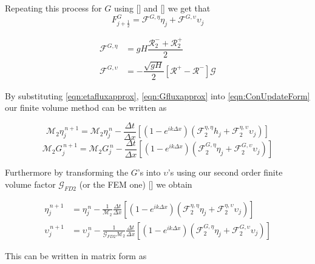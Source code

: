 Repeating this process for $G$ using [] and [] we get that
\begin{equation}
\label{eqn:Gfluxapprox}
F^{G}_{j+\frac{1}{2}} =  \mathcal{F}^{G,\eta} \eta_{j}  + \mathcal{F}^{G,\upsilon} \upsilon_j
\end{equation}

\begin{align*}
\mathcal{F}^{G,\eta} & = gH \dfrac{\mathcal{R}^-_2 + \mathcal{R}^+_2 }{ 2} \\
\mathcal{F}^{G,\upsilon} & = - \dfrac{ \sqrt{gH}}{ 2} \left [  \mathcal{R}^+ -  \mathcal{R}^- \right ] \mathcal{G}
\end{align*}


By substituting \eqref{eqn:etafluxapprox}, \eqref{eqn:Gfluxapprox} into \eqref{eqn:ConUpdateForm} our finite volume method can be written as

\begin{equation*}
\mathcal{M}_2 \eta^{\,n + 1}_{j} = \mathcal{M}_2 \eta^{\,n }_{j} - \frac{\Delta t}{\Delta x}  \left[ \left(1 - e^{ik\Delta x}\right) \left(\mathcal{F}_2^{\eta,\eta} h_{j}  + \mathcal{F}_2^{\eta,\upsilon} \upsilon_j \right) \right]
\end{equation*}
\begin{equation*}
\mathcal{M}_2 G^{\,n + 1}_{j} = \mathcal{M}_2 G^{\,n }_{j} - \frac{\Delta t}{\Delta x}  \left[ \left(1 - e^{ik\Delta x}\right) \left(  \mathcal{F}_2^{G,\eta} \eta_{j}  + \mathcal{F}_2^{G,\upsilon} \upsilon_j \right) \right]
\end{equation*}
	
Furthermore by transforming the $G$'s into $\upsilon$'s using our second order finite volume factor $\mathcal{G}_{FD2}$ (or the FEM one) [] we obtain
	
\begin{align*}
\eta^{\,n + 1}_{j} &= \eta^{\,n }_{j} - \frac{1}{\mathcal{M}_2}\frac{\Delta t}{\Delta x}  \left[ \left(1 - e^{ik\Delta x}\right) \left(\mathcal{F}_2^{\eta,\eta} \eta_{j}  + \mathcal{F}_2^{\eta,\upsilon} \upsilon_j \right) \right] \\
\upsilon^{\,n + 1}_{j} &= \upsilon^{\,n }_{j} -  \frac{1}{\mathcal{G}_{FD2} \mathcal{M}_2}\frac{\Delta t}{\Delta x}  \left[ \left(1 - e^{ik\Delta x}\right) \left(  \mathcal{F}_2^{G,\eta} \eta_{j}  + \mathcal{F}_2^{G,\upsilon} \upsilon_j \right) \right]
\end{align*}

This can be written in matrix form as

